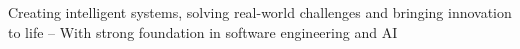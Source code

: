 


\begin{cvparagraph}
Creating intelligent systems, solving real-world challenges and bringing innovation to life -- With strong foundation in software engineering and AI

\end{cvparagraph}
